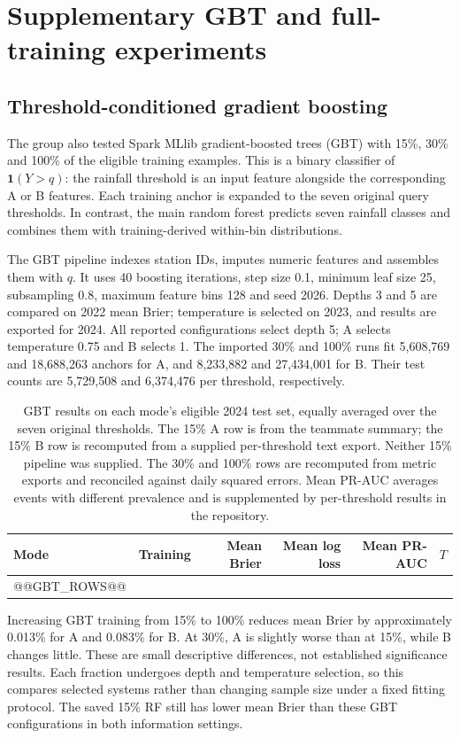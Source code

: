 \clearpage
\section{Supplementary GBT and full-training experiments}\label{sec:teammate}
\subsection{Threshold-conditioned gradient boosting}
The group also tested Spark MLlib gradient-boosted trees (GBT) with 15\%, 30\% and 100\% of the eligible training examples. This is a binary classifier of $\mathbf1(Y>q)$: the rainfall threshold is an input feature alongside the corresponding A or B features. Each training anchor is expanded to the seven original query thresholds. In contrast, the main random forest predicts seven rainfall classes and combines them with training-derived within-bin distributions.

The GBT pipeline indexes station IDs, imputes numeric features and assembles them with $q$. It uses 40 boosting iterations, step size 0.1, minimum leaf size 25, subsampling 0.8, maximum feature bins 128 and seed 2026. Depths 3 and 5 are compared on 2022 mean Brier; temperature is selected on 2023, and results are exported for 2024. All reported configurations select depth 5; A selects temperature 0.75 and B selects 1. The imported 30\% and 100\% runs fit 5,608,769 and 18,688,263 anchors for A, and 8,233,882 and 27,434,001 for B. Their test counts are 5,729,508 and 6,374,476 per threshold, respectively.

\begin{table}[!ht]\centering\small
\begin{tabular}{lrrrrr}\toprule
Mode & Training & Mean Brier & Mean log loss & Mean PR-AUC & $T$\\\midrule
@@GBT_ROWS@@
\bottomrule\end{tabular}
\caption{GBT results on each mode's eligible 2024 test set, equally averaged over the seven original thresholds. The 15\% A row is from the teammate summary; the 15\% B row is recomputed from a supplied per-threshold text export. Neither 15\% pipeline was supplied. The 30\% and 100\% rows are recomputed from metric exports and reconciled against daily squared errors. Mean PR-AUC averages events with different prevalence and is supplemented by per-threshold results in the repository.}\label{tab:gbtsampling}
\end{table}
\FloatBarrier


Increasing GBT training from 15\% to 100\% reduces mean Brier by approximately 0.013\% for A and 0.083\% for B. At 30\%, A is slightly worse than at 15\%, while B changes little. These are small descriptive differences, not established significance results. Each fraction undergoes depth and temperature selection, so this compares selected systems rather than changing sample size under a fixed fitting protocol. The saved 15\% RF still has lower mean Brier than these GBT configurations in both information settings.


